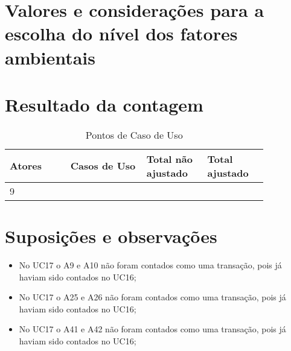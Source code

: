\section{Valores e considerações para a escolha do nível dos fatores ambientais}

\pagebreak
\section{Resultado da contagem}

\begin{table*}[!h]
\centering
\caption{Pontos de Caso de Uso}
\label{Rotulo}
  \begin{tabular}{|p{0.20\linewidth}|p{0.25\linewidth}|p{0.20\linewidth}|p{0.20\linewidth}|}
  \hline
  \textbf{Atores} & \textbf{Casos de Uso} & \textbf{Total não ajustado} & \textbf{Total ajustado} \\ 
  \hline

  9 & & &\\
  \hline
  \end{tabular}
\end{table*}


\section{Suposições e observações}
  
  \begin{itemize}
   \item No UC17 o A9 e A10 não foram contados como uma transação, pois já haviam sido contados no UC16;	
   \item No UC17 o A25 e A26 não foram contados como uma transação, pois já haviam sido contados no UC16;	
   \item No UC17 o A41 e A42 não foram contados como uma transação, pois já haviam sido contados no UC16;	
\end{itemize}

  

